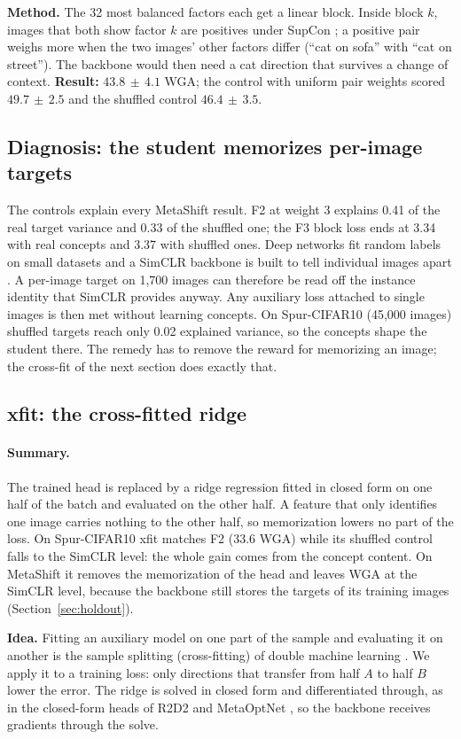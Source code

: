 \documentclass[11pt]{article}
\newcommand{\pmsd}[2]{$#1{\scriptstyle\,\pm\,#2}$}
\newcommand{\summary}{\paragraph{Summary.}}
\begin{document}
\textbf{Method.} The 32 most balanced factors each get a linear block. Inside block $k$, images that both show
factor $k$ are positives under SupCon \citep{khosla2020supcon}; a positive pair weighs more when the two images'
other factors differ (``cat on sofa'' with ``cat on street''). The backbone would then need a cat direction that
survives a change of context. \textbf{Result:} \pmsd{43.8}{4.1} WGA; the control with uniform pair weights scored
\pmsd{49.7}{2.5} and the shuffled control \pmsd{46.4}{3.5}.

\subsection{Diagnosis: the student memorizes per-image targets}
The controls explain every MetaShift result. F2 at weight 3 explains 0.41 of the real target variance and 0.33
of the shuffled one; the F3 block loss ends at 3.34 with real concepts and 3.37 with shuffled ones. Deep networks
fit random labels on small datasets \citep{zhang2017rethinking,arpit2017memorization} and a SimCLR backbone is
built to tell individual images apart \citep{wu2018instance,wang2020alignment}. A per-image target on 1,700
images can therefore be read off the instance identity that SimCLR provides anyway. Any auxiliary loss attached
to single images is then met without learning concepts. On Spur-CIFAR10 (45,000 images) shuffled targets reach
only 0.02 explained variance, so the concepts shape the student there. The remedy has to remove the reward for
memorizing an image; the cross-fit of the next section does exactly that.

\subsection{xfit: the cross-fitted ridge}
\label{sec:xfit}
\summary The trained head is replaced by a ridge regression fitted in closed form on one half of the batch and
evaluated on the other half. A feature that only identifies one image carries nothing to the other half, so
memorization lowers no part of the loss. On Spur-CIFAR10 xfit matches F2 (33.6 WGA) while its shuffled control
falls to the SimCLR level: the whole gain comes from the concept content. On MetaShift it removes the
memorization of the head and leaves WGA at the SimCLR level, because the backbone still stores the targets of
its training images (Section~\ref{sec:holdout}).

\textbf{Idea.} Fitting an auxiliary model on one part of the sample and evaluating it on another is the
sample splitting (cross-fitting) of double machine learning \citep{chernozhukov2018dml}. We apply it to a training loss: only
directions that transfer from half $A$ to half $B$ lower the error. The ridge is solved in closed form and
differentiated through, as in the closed-form heads of R2D2 \citep{bertinetto2019r2d2} and MetaOptNet
\citep{lee2019metaoptnet}, so the backbone receives gradients through the solve.
\end{document}
